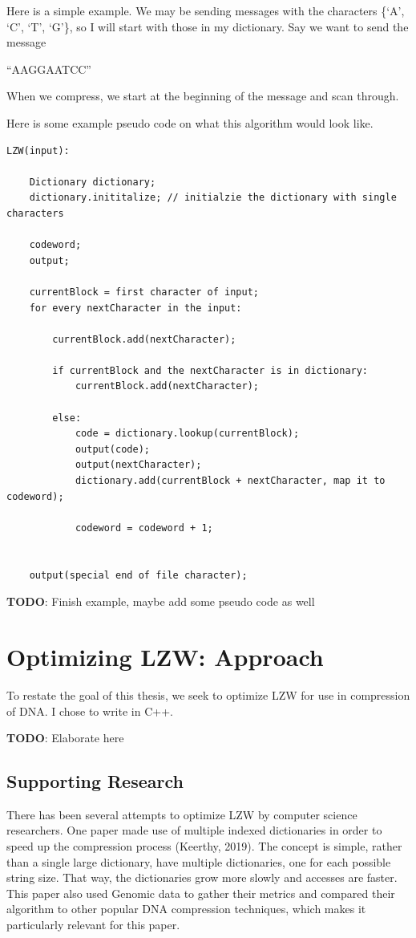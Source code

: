 \documentclass[12pt,twoside]{reedthesis}
\begin{document}
Here is a simple example. We may be sending messages with the characters \{`A', `C', `T', `G'\}, so I will start with those in my dictionary. Say we want to send the message

``AAGGAATCC''

When we compress, we start at the beginning of the message and scan through.

Here is some example pseudo code on what this algorithm would look like.
\begin{verbatim}
LZW(input):

    Dictionary dictionary;
    dictionary.inititalize; // initialzie the dictionary with single characters

    codeword;
    output;

    currentBlock = first character of input;
    for every nextCharacter in the input:

        currentBlock.add(nextCharacter);

        if currentBlock and the nextCharacter is in dictionary:
            currentBlock.add(nextCharacter);
            
        else:
            code = dictionary.lookup(currentBlock);
            output(code);
            output(nextCharacter);
            dictionary.add(currentBlock + nextCharacter, map it to codeword);

            codeword = codeword + 1;


    output(special end of file character);
\end{verbatim}
\textbf{TODO}: Finish example, maybe add some pseudo code as well

\hypertarget{optimizing-lzw-approach}{%
\chapter{Optimizing LZW: Approach}\label{optimizing-lzw-approach}}

To restate the goal of this thesis, we seek to optimize LZW for use in compression of DNA. I chose to write in C++.

\textbf{TODO}: Elaborate here

\hypertarget{supporting-research}{%
\section{Supporting Research}\label{supporting-research}}

There has been several attempts to optimize LZW by computer science researchers. One paper made use of multiple indexed dictionaries in order to speed up the compression process (Keerthy, 2019). The concept is simple, rather than a single large dictionary, have multiple dictionaries, one for each possible string size. That way, the dictionaries grow more slowly and accesses are faster. This paper also used Genomic data to gather their metrics and compared their algorithm to other popular DNA compression techniques, which makes it particularly relevant for this paper.
\end{document}
